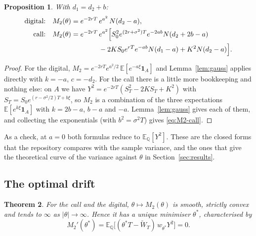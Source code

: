 \documentclass[11pt,a4paper]{article}
\theoremstyle{plain}
\newtheorem{theorem}{Theorem}[section]
\newtheorem{proposition}[theorem]{Proposition}
\theoremstyle{definition}
\theoremstyle{remark}
\newcommand{\E}{\mathbb{E}}
\newcommand{\Q}{\mathbb{Q}}
\newcommand{\1}{\mathbf{1}}
\newcommand{\Wt}{\widetilde{W}}
\begin{document}
\begin{proposition}\label{prop:M2-closed}
With $d_1 = d_2 + b$:
\begin{align}
  \text{digital:}\quad M_2(\theta) &= e^{-2rT}\, e^{a^2}\, N(d_2 - a), \label{eq:M2-dig}\\
  \text{call:}\quad M_2(\theta) &= e^{-2rT}\, e^{a^2}\Bigl[S_0^2 e^{(2r + \sigma^2)T} e^{-2ab} N(d_2 + 2b - a) \notag\\
  &\qquad\qquad - 2KS_0 e^{rT} e^{-ab} N(d_1 - a) + K^2 N(d_2 - a)\Bigr]. \label{eq:M2-call}
\end{align}
\end{proposition}

\begin{proof}
For the digital, $M_2 = e^{-2rT}e^{a^2/2}\,\E[e^{-a\xi}\1_A]$ and Lemma~\ref{lem:gauss} applies directly with $k = -a$, $c = -d_2$. For the call there is a little more bookkeeping and nothing else: on $A$ we have $Y^2 = e^{-2rT}(S_T^2 - 2KS_T + K^2)$ with $S_T = S_0 e^{(r - \sigma^2/2)T + b\xi}$, so $M_2$ is a combination of the three expectations $\E[e^{k\xi}\1_A]$ with $k = 2b - a$, $b - a$ and $-a$. Lemma~\ref{lem:gauss} gives each of them, and collecting the exponentials (with $b^2 = \sigma^2 T$) gives \eqref{eq:M2-call}.
\end{proof}

As a check, at $a = 0$ both formulas reduce to $\E_\Q[Y^2]$. These are the closed forms that the repository compares with the sample variance, and the ones that give the theoretical curve of the variance against $\theta$ in Section~\ref{sec:results}.

\subsection{The optimal drift}

\begin{theorem}\label{thm:thetastar}
For the call and the digital, $\theta \mapsto M_2(\theta)$ is smooth, strictly convex and tends to $\infty$ as $|\theta| \to \infty$. Hence it has a unique minimiser $\theta^*$, characterised by
\begin{equation}\label{eq:foc}
  M_2'(\theta^*) = \E_\Q\bigl[(\theta^* T - \Wt_T)\, w_{\theta^*} Y^2\bigr] = 0 .
\end{equation}
\end{theorem}
\end{document}

